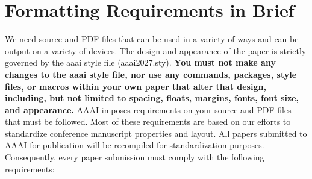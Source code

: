 \documentclass[letterpaper]{article} %
\begin{document}
\section{Formatting Requirements in Brief}
We need source and PDF files that can be used in a variety of ways and can be output on a variety of devices. The design and appearance of the paper is strictly governed by the aaai style file (aaai2027.sty).
\textbf{You must not make any changes to the aaai style file, nor use any commands, packages, style files, or macros within your own paper that alter that design, including, but not limited to spacing, floats, margins, fonts, font size, and appearance.} AAAI imposes requirements on your source and PDF files that must be followed. Most of these requirements are based on our efforts to standardize conference manuscript properties and layout. All papers submitted to AAAI for publication will be recompiled for standardization purposes. Consequently, every paper submission must comply with the following requirements:
\end{document}
